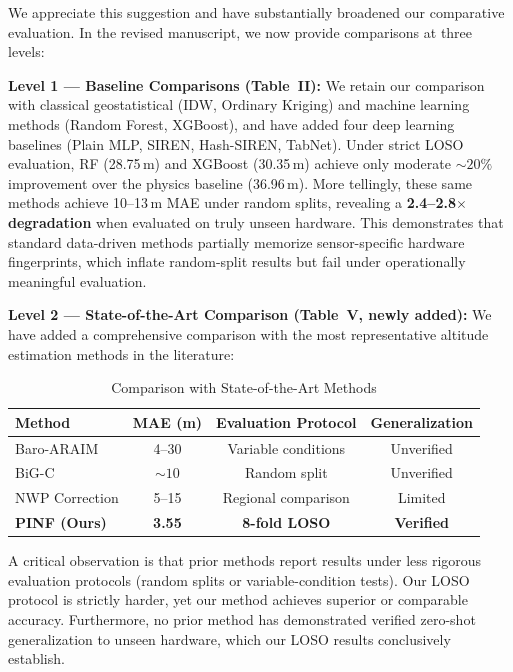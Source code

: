 We appreciate this suggestion and have substantially broadened our comparative evaluation. In the revised manuscript, we now provide comparisons at three levels:

\textbf{Level 1 --- Baseline Comparisons (Table~II):}
We retain our comparison with classical geostatistical (IDW, Ordinary Kriging) and machine learning methods (Random Forest, XGBoost), and have added four deep learning baselines (Plain MLP, SIREN, Hash-SIREN, TabNet). Under strict LOSO evaluation, RF (28.75\,m) and XGBoost (30.35\,m) achieve only moderate ${\sim}20\%$ improvement over the physics baseline (36.96\,m). More tellingly, these same methods achieve 10--13\,m MAE under random splits, revealing a \textbf{2.4--2.8$\times$ degradation} when evaluated on truly unseen hardware. This demonstrates that standard data-driven methods partially memorize sensor-specific hardware fingerprints, which inflate random-split results but fail under operationally meaningful evaluation.

\textbf{Level 2 --- State-of-the-Art Comparison (Table~V, newly added):}
We have added a comprehensive comparison with the most representative altitude estimation methods in the literature:

\begin{table}[h]
\centering
\caption{Comparison with State-of-the-Art Methods}
\begin{tabular}{lccc}
\toprule
\textbf{Method} & \textbf{MAE (m)} & \textbf{Evaluation Protocol} & \textbf{Generalization} \\
\midrule
Baro-ARAIM \cite{simonetti2024geodetic} & 4--30 & Variable conditions & Unverified \\
BiG-C \cite{narayanan2022enhanced} & ${\sim}10$ & Random split & Unverified \\
NWP Correction \cite{schumann2017use} & 5--15 & Regional comparison & Limited \\
\midrule
\textbf{PINF (Ours)} & \textbf{3.55} & \textbf{8-fold LOSO} & \textbf{Verified} \\
\bottomrule
\end{tabular}
\end{table}

A critical observation is that prior methods report results under less rigorous evaluation protocols (random splits or variable-condition tests). Our LOSO protocol is strictly harder, yet our method achieves superior or comparable accuracy. Furthermore, no prior method has demonstrated verified zero-shot generalization to unseen hardware, which our LOSO results conclusively establish.

